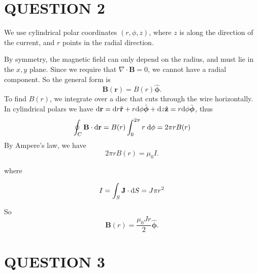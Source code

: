 \documentclass[a4paper]{article}
\begin{document}
\begin{itemize}
\end{itemize}




\section{QUESTION 2}


 We use cylindrical polar coordinates $(r, \phi, z)$, where $z$ is along the direction of the current, and $r$ points in the radial direction.
\begin{center}
\end{center}
By symmetry, the magnetic field can only depend on the radius, and must lie in the $x,y$ plane. Since we require that $\nabla\cdot \mathbf{B} = 0$, we cannot have a radial component. So the general form is
\[
\mathbf{B}(\mathbf{r}) = B(r)\hat{\boldsymbol\phi}.
\]
To find $B(r)$, we integrate over a disc that cuts through the wire horizontally. In cylindrical polars we have $ \mathrm{d} \mathbf{r} = \mathrm{d} r \hat{\mathbf{r}} + r \mathrm{d} \phi \hat{\boldsymbol\phi} + \mathrm{d} z \hat{\mathbf{z}} = r \mathrm{d} \phi \hat{\boldsymbol\phi} $, thus
\[
\oint_C \mathbf{B}\cdot \mathrm{d} \mathbf{r} = B(r)\int_0^{2\pi} r\;\mathrm{d} \phi = 2\pi r B(r)
\]
By Ampere's law, we have
\[
2\pi rB(r) = \mu_0 I.
\]

where 

\[ I = \int_S \mathbf{J}\cdot \mathrm{d} S = J \pi r^{2} \]

So
\[
\mathbf{B}(r) = \frac{\mu_0 J r}{2 } \hat{\boldsymbol\phi}.
\]



\section{QUESTION 3}
\end{document}
